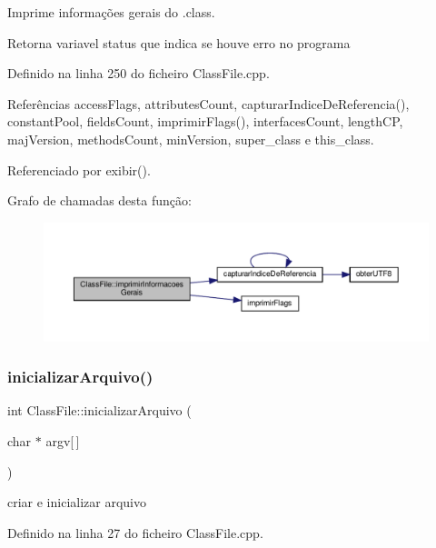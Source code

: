 Imprime informações gerais do .class. 

\begin{DoxyReturn}{Retorna}
variavel status que indica se houve erro no programa 
\end{DoxyReturn}


Definido na linha 250 do ficheiro Class\+File.\+cpp.



Referências access\+Flags, attributes\+Count, capturar\+Indice\+De\+Referencia(), constant\+Pool, fields\+Count, imprimir\+Flags(), interfaces\+Count, length\+CP, maj\+Version, methods\+Count, min\+Version, super\+\_\+class e this\+\_\+class.



Referenciado por exibir().

Grafo de chamadas desta função\+:
\nopagebreak
\begin{figure}[H]
\begin{center}
\leavevmode
\includegraphics[width=350pt]{classClassFile_a482ed64fcd8a1b79d3622b3f59b5767a_cgraph}
\end{center}
\end{figure}
\mbox{\label{classClassFile_a5fa3d7587821ed1c8e3eabb94544da29}} 
\subsubsection{\texorpdfstring{inicializar\+Arquivo()}{inicializarArquivo()}}
{\footnotesize\ttfamily int Class\+File\+::inicializar\+Arquivo (\begin{DoxyParamCaption}\item[{char $\ast$}]{argv\mbox{[}$\,$\mbox{]} }\end{DoxyParamCaption})}



criar e inicializar arquivo 



Definido na linha 27 do ficheiro Class\+File.\+cpp.



